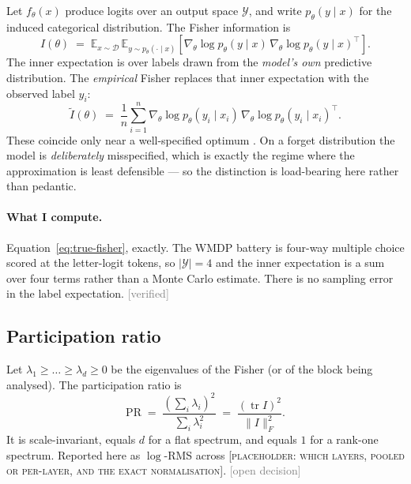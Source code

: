 \documentclass[11pt]{article}
\newcommand{\status}[1]{\textcolor{gray}{\footnotesize\textsf{[#1]}}}
\newcommand{\verified}{\status{verified}}
\newcommand{\open}{\status{open decision}}
\begin{document}
Let $f_\theta(x)$ produce logits over an output space $\mathcal{Y}$, and write
$p_\theta(y \mid x)$ for the induced categorical distribution. The Fisher
information is
\begin{equation}
  I(\theta) \;=\; \mathbb{E}_{x \sim \mathcal{D}}\,
  \mathbb{E}_{y \sim p_\theta(\cdot \mid x)}
  \!\left[ \nabla_\theta \log p_\theta(y \mid x)\,
           \nabla_\theta \log p_\theta(y \mid x)^\top \right].
  \label{eq:true-fisher}
\end{equation}
The inner expectation is over labels drawn from the \emph{model's own}
predictive distribution. The \emph{empirical} Fisher replaces that inner
expectation with the observed label $y_i$:
\begin{equation}
  \tilde{I}(\theta) \;=\; \frac{1}{n}\sum_{i=1}^{n}
  \nabla_\theta \log p_\theta(y_i \mid x_i)\,
  \nabla_\theta \log p_\theta(y_i \mid x_i)^\top .
  \label{eq:emp-fisher}
\end{equation}
These coincide only near a well-specified optimum \citep{kunstner2019}. On a
forget distribution the model is \emph{deliberately} misspecified, which is
exactly the regime where the approximation is least defensible --- so the
distinction is load-bearing here rather than pedantic.

\paragraph{What I compute.} Equation~\eqref{eq:true-fisher}, exactly. The WMDP
battery is four-way multiple choice scored at the letter-logit tokens, so
$|\mathcal{Y}| = 4$ and the inner expectation is a sum over four terms rather
than a Monte Carlo estimate. There is no sampling error in the label
expectation. \verified{}

\subsection{Participation ratio}

Let $\lambda_1 \geq \dots \geq \lambda_d \geq 0$ be the eigenvalues of the
Fisher (or of the block being analysed). The participation ratio is
\begin{equation}
  \mathrm{PR} \;=\; \frac{\left(\sum_i \lambda_i\right)^2}{\sum_i \lambda_i^2}
  \;=\; \frac{(\operatorname{tr} I)^2}{\|I\|_F^2}.
  \label{eq:pr}
\end{equation}
It is scale-invariant, equals $d$ for a flat spectrum, and equals $1$ for a
rank-one spectrum. Reported here as $\log$-RMS across
\textsc{[placeholder: which layers, pooled or per-layer, and the exact
normalisation]}. \open{}
\end{document}
